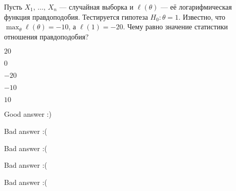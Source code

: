 
\begin{question}
Пусть \(X_1, \, \ldots, \, X_n\) --- случайная выборка и
\(\ell(\theta)\) --- её логарифмическая функция правдоподобия.
Тестируется гипотеза \(H_0: \theta = 1\). Известно, что
\(\max_{\theta}\ell(\theta) = -10\), а \(\ell(1) = -20\). Чему равно
значение статистики отношения правдоподобия?
\begin{answerlist}
  \item \(20\)
  \item \(0\)
  \item \(-20\)
  \item \(-10\)
  \item \(10\)
\end{answerlist}
\end{question}

\begin{solution}
\begin{answerlist}
  \item Good answer :)
  \item Bad answer :(
  \item Bad answer :(
  \item Bad answer :(
  \item Bad answer :(
\end{answerlist}
\end{solution}

